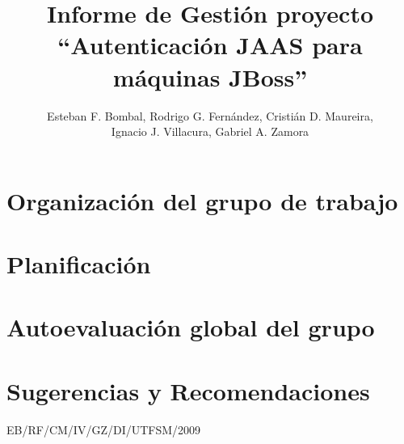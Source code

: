 \documentclass[12pt,letterpaper]{article}
\title{Informe de Gestión proyecto \\``Autenticación JAAS para máquinas JBoss''}
\author{
Esteban F. Bombal,
Rodrigo G. Fernández,
Cristián D. Maureira,\\
Ignacio J. Villacura,
Gabriel A. Zamora
}
\begin{document}

\maketitle\thispagestyle{empty}

\section{Organización del grupo de trabajo}
\label{target:reprogramacion}


\section{Planificación}
\label{target:reprogramacion}


\section{Autoevaluación global del grupo}
\label{target:reprogramacion}


\section{Sugerencias y Recomendaciones}
\label{target:reprogramacion}


\vfill \hfill EB/RF/CM/IV/GZ/DI/UTFSM/2009
\end{document}

